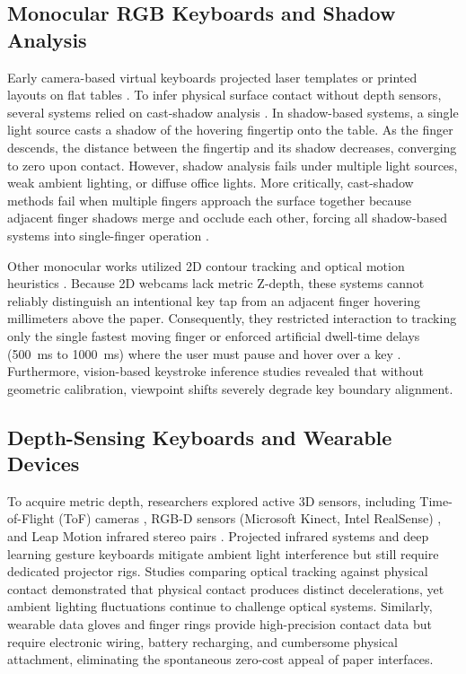 \documentclass[conference]{IEEEtran}
\begin{document}
\subsection{Monocular RGB Keyboards and Shadow Analysis}
Early camera-based virtual keyboards projected laser templates or printed layouts on flat tables \cite{Zhang2001Visual, Cheng2015Fingertip}. To infer physical surface contact without depth sensors, several systems relied on cast-shadow analysis \cite{Thomas2013Camera, Posner2012Single, Yue2014Blind}. In shadow-based systems, a single light source casts a shadow of the hovering fingertip onto the table. As the finger descends, the distance between the fingertip and its shadow decreases, converging to zero upon contact. However, shadow analysis fails under multiple light sources, weak ambient lighting, or diffuse office lights. More critically, cast-shadow methods fail when multiple fingers approach the surface together because adjacent finger shadows merge and occlude each other, forcing all shadow-based systems into single-finger operation \cite{Thomas2013Camera}.

Other monocular works utilized 2D contour tracking and optical motion heuristics \cite{Srivastava2012RealTime, Khare2019QWERTY, Ji2018Local, Sreenath2021Monocular}. Because 2D webcams lack metric Z-depth, these systems cannot reliably distinguish an intentional key tap from an adjacent finger hovering millimeters above the paper. Consequently, they restricted interaction to tracking only the single fastest moving finger \cite{Ji2018Local} or enforced artificial dwell-time delays (500~ms to 1000~ms) where the user must pause and hover over a key \cite{Khare2019QWERTY, Chen2024Gaze}. Furthermore, vision-based keystroke inference studies \cite{Yang2022Towards} revealed that without geometric calibration, viewpoint shifts severely degrade key boundary alignment.

\subsection{Depth-Sensing Keyboards and Wearable Devices}
To acquire metric depth, researchers explored active 3D sensors, including Time-of-Flight (ToF) cameras \cite{Lee2019Virtual}, RGB-D sensors (Microsoft Kinect, Intel RealSense) \cite{Toshpulatov2024RealTime}, and Leap Motion infrared stereo pairs \cite{Pilkov2024Markerless}. Projected infrared systems \cite{Kudale2016RealTime} and deep learning gesture keyboards \cite{Lee2022Virtual} mitigate ambient light interference but still require dedicated projector rigs. Studies comparing optical tracking against physical contact \cite{MacRitchie2015Integrating, Schenck2024Utilizing} demonstrated that physical contact produces distinct decelerations, yet ambient lighting fluctuations \cite{Webber2021Finger} continue to challenge optical systems. Similarly, wearable data gloves and finger rings provide high-precision contact data but require electronic wiring, battery recharging, and cumbersome physical attachment, eliminating the spontaneous zero-cost appeal of paper interfaces.
\end{document}
